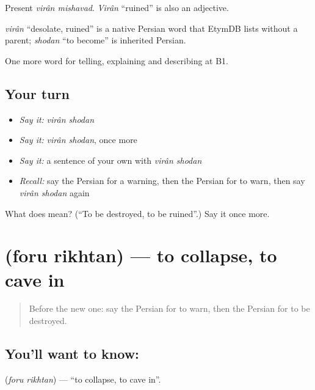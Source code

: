 Present \emph{virân mishavad}. \emph{Virân} \textquotedblleft{}ruined\textquotedblright{} is also an adjective.

\begin{cousinweb}
\emph{virân} \textquotedblleft{}desolate, ruined\textquotedblright{} is a native Persian word that EtymDB lists without a parent; \emph{shodan} \textquotedblleft{}to become\textquotedblright{} is inherited Persian.
\end{cousinweb}

\begin{grammarlens}[title={What you've built}]
One more word for telling, explaining and describing at B1.
\end{grammarlens}

\subsection*{Your turn}
\begin{itemize}
\raggedright
  \item \emph{Say it:} \emph{virân shodan}
  \item \emph{Say it:} \emph{virân shodan}, once more
  \item \emph{Say it:} a sentence of your own with \emph{virân shodan}
  \item \emph{Recall:} say the Persian for a warning, then the Persian for to warn, then say \emph{virân shodan} again
\end{itemize}

\begin{tcolorbox}[breakable,colback=teal!4,colframe=teal!35!black,title={Before you move on}]
What does   mean? (\textquotedblleft{}To be destroyed, to be ruined\textquotedblright{}.) Say it once more.
\end{tcolorbox}
\section[\texorpdfstring{\fa{فرو} \fa{ریختن} (foru rikhtan)}{فرو ریختن (foru rikhtan)}]{  (foru rikhtan) — to collapse, to cave in}

\label{lesson:FA-C331-foru-rikhtan}



\begin{quote}
Before the new one: say the Persian for to warn, then the Persian for to be destroyed.
\end{quote}

\subsection*{You'll want to know:  }
\textbf{ } (\emph{foru rikhtan}) — \textquotedblleft{}to collapse, to cave in\textquotedblright{}.


